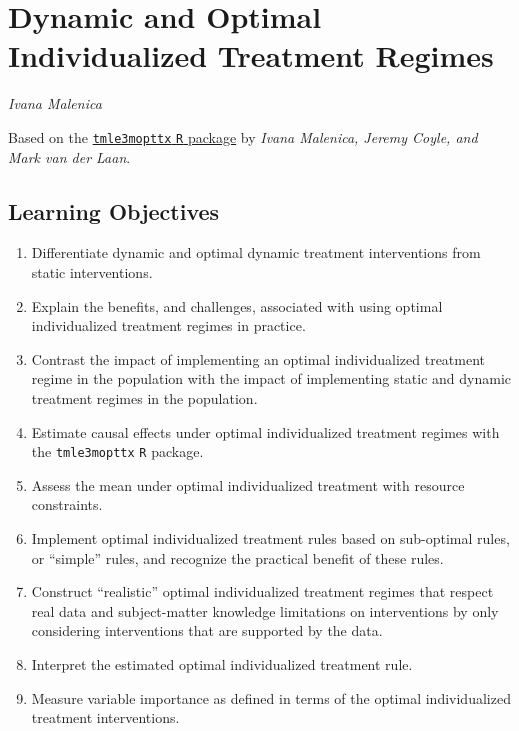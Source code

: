 \documentclass[
  12pt, krantz2,
]{krantz}
\newcommand{\passthrough}[1]{#1}
\providecommand{\tightlist}{%
  \setlength{\itemsep}{0pt}\setlength{\parskip}{0pt}}
\newcommand{\1}{\mathbbm{1}}
\theoremstyle{definition}
\theoremstyle{definition}
\theoremstyle{definition}
\theoremstyle{definition}
\theoremstyle{remark}
\begin{document}
\hypertarget{dynamic-and-optimal-individualized-treatment-regimes}{%
\chapter{Dynamic and Optimal Individualized Treatment Regimes}\label{dynamic-and-optimal-individualized-treatment-regimes}}

\emph{Ivana Malenica}

Based on the \href{https://github.com/tlverse/tmle3mopttx}{\passthrough{\lstinline!tmle3mopttx!} \passthrough{\lstinline!R!} package}
by \emph{Ivana Malenica, Jeremy Coyle, and Mark van der Laan}.

\hypertarget{learning-objectives-1}{%
\section{Learning Objectives}\label{learning-objectives-1}}

\begin{enumerate}
\def\labelenumi{\arabic{enumi}.}
\tightlist
\item
  Differentiate dynamic and optimal dynamic treatment interventions from static
  interventions.
\item
  Explain the benefits, and challenges, associated with using optimal
  individualized treatment regimes in practice.
\item
  Contrast the impact of implementing an optimal individualized treatment
  regime in the population with the impact of implementing static and dynamic
  treatment regimes in the population.
\item
  Estimate causal effects under optimal individualized treatment regimes with
  the \passthrough{\lstinline!tmle3mopttx!} \passthrough{\lstinline!R!} package.
\item
  Assess the mean under optimal individualized treatment with resource
  constraints.
\item
  Implement optimal individualized treatment rules based on sub-optimal
  rules, or ``simple'' rules, and recognize the practical benefit of these rules.
\item
  Construct ``realistic'' optimal individualized treatment regimes that respect
  real data and subject-matter knowledge limitations on interventions by
  only considering interventions that are supported by the data.
\item
  Interpret the estimated optimal individualized treatment rule.
\item
  Measure variable importance as defined in terms of the optimal individualized
  treatment interventions.
\end{enumerate}
\end{document}
